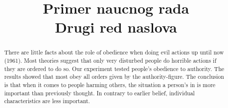 \documentclass[conference]{IEEEtran}
\begin{document}

\title{Primer naucnog rada\\Drugi red naslova}

\author{
\and
{}
\and
{}
}

\maketitle
\begin{abstract}
There are little facts about the role of obedience when doing evil actions up until now (1961). 
Most theories suggest that only very disturbed people do horrible actions if they are ordered to 
do so. Our experiment tested people's obedience to authority. The results showed that most obey 
all orders given by the authority-figure. The conclusion is that when it comes to people harming 
others, the situation a person's in is more important than previously thought. In contrary to 
earlier belief, individual characteristics are less important.
\end{abstract}
\end{document}
